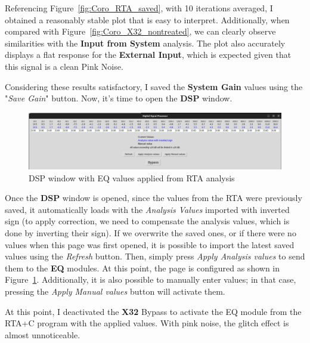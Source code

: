 Referencing Figure~\ref{fig:Coro_RTA_saved}, with 10 iterations averaged, I obtained a reasonably stable plot that is easy to interpret. Additionally, when compared with Figure~\ref{fig:Coro_X32_nontreated}, we can clearly observe similarities with the \textbf{Input from System} analysis. The plot also accurately displays a flat response for the \textbf{External Input}, which is expected given that this signal is a clean Pink Noise.

Considering these results satisfactory, I saved the \textbf{System Gain} values using the "\textit{Save Gain}" button. Now, it's time to open the \textbf{DSP} window.

\begin{figure}[H]
	\centering
	\includegraphics[width=1
	\linewidth]{Figures/Coro_EQ_from_RTA.png}
	\caption{DSP window with EQ values applied from RTA analysis}
	\label{fig:Coro_EQ_RTA+C}
\end{figure}

Once the \textbf{DSP} window is opened, since the values from the RTA were previously saved, it automatically loads with the \textit{Analysis Values} imported with inverted sign (to apply correction, we need to compensate the analysis values, which is done by inverting their sign). If we overwrite the saved ones, or if there were no values when this page was first opened, it is possible to import the latest saved values using the \textit{Refresh} button. Then, simply press \textit{Apply Analysis values} to send them to the \textbf{EQ} modules. At this point, the page is configured as shown in Figure~\ref{fig:Coro_EQ_RTA+C}. Additionally, it is also possible to manually enter values; in that case, pressing the \textit{Apply Manual values} button will activate them.

At this point, I deactivated the \textbf{X32} Bypass to activate the EQ module from the RTA+C program with the applied values. With pink noise, the glitch effect is almost unnoticeable.

